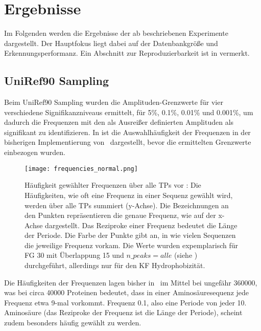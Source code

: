 \section{Ergebnisse} %
    \label{sec:ergebnisse}
    Im Folgenden werden die Ergebnisse der \NumWord{\theexperiment} ab  beschriebenen Experimente dargestellt. Der Hauptfokus liegt dabei auf der Datenbankgröße und Erkennungsperformanz. Ein Abschnitt zur Reproduzierbarkeit ist in  vermerkt.

    \subsection{UniRef90 Sampling} %
        \label{sub:uniref90_results}

        Beim UniRef90 Sampling wurden die Amplituden-Grenzwerte für vier verschiedene Signifikanzniveaus ermittelt, für 5\%, 0.1\%, 0.01\% und 0.001\%, um dadurch die Frequenzen mit den als Ausreißer definierten Amplituden als signifikant zu identifizieren. In  ist die Auswahlhäufigkeit der Frequenzen in der bisherigen Implementierung von \protfin\ dargestellt, bevor die ermittelten Grenzwerte einbezogen wurden.

        \begin{figure}[H]
            \texttt{[image: frequencies\_normal.png]}
            \caption[Häufigkeit gewählter Frequenzen über alle \aclp{TP} vor ]{Häufigkeit gewählter Frequenzen über alle \acp{TP} vor : Die Häufigkeiten, wie oft eine Frequenz in einer Sequenz gewählt wird, werden über alle \acp{TP} summiert (y-Achse). Die Bezeichnungen an den Punkten repräsentieren die genaue Frequenz, wie auf der x-Achse dargestellt. Das Reziproke einer Frequenz bedeutet die Länge der Periode. Die Farbe der Punkte gibt an, in wie vielen Sequenzen die jeweilige Frequenz vorkam. Die Werte wurden expemplarisch für \acl{FG} 30 mit Überlappung 15 und $n\_peaks=alle$ (siehe ) durchgeführt, allerdings nur für den \ac{KF} Hydrophobizität.}
            \label{fig:frequencies_normal}
        \end{figure}

        Die Häufigkeiten der Frequenzen lagen bisher in \protfin\ im Mittel bei ungefähr 360000, was bei circa 40000 Proteinen bedeutet, dass in einer Aminosäuresequenz jede Frequenz etwa 9-mal vorkommt. Frequenz 0.1, also eine Periode von jeder 10. Aminosäure (das Reziproke der Frequenz ist die Länge der Periode), scheint zudem besonders häufig gewählt zu werden.

